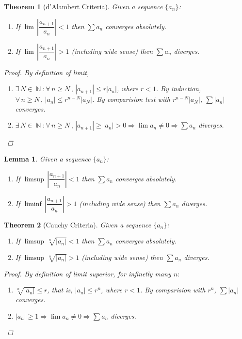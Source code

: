 \documentclass[12pt]{article}
\let\RA\Rightarrow
\newcommand{\Forall}[1]{\forall\,{#1}\,,\,}
\newcommand{\Exist}[1]{\exists\,{#1}:}
\DeclareMathOperator{\N}{\mathbb{N}}
\newtheorem{theorem}{Theorem}[subsection]
\newtheorem{lemma}{Lemma}[subsection]
\begin{document}
\begin{theorem}[d'Alambert Criteria]
  Given a sequence $\{a_n\}$:
  \begin{enumerate}
    \item If $\lim\,\left|\dfrac{a_{n+1}}{a_n}\right|<1$ then $\sum a_n$ converges absolutely.
    \item If $\lim\,\left|\dfrac{a_{n+1}}{a_n}\right|>1$ (including wide sense) then $\sum a_n$ diverges.
  \end{enumerate}
  \begin{proof}
    By definition of limit,
    \begin{enumerate}
      \item $\Exist{N\in\N}\Forall{n\geq N} |a_{n+1}|\leq r|a_n|$, where $r<1$. By induction, $\Forall{n\geq N}|a_n|\leq r^{n-N}|a_N|$. By comparision test with $r^{n-N}|a_N|$,  $\sum |a_n|$ converges.
      \item $\Exist{N\in\N}\Forall{n\geq N} |a_{n+1}|\geq |a_n|>0\RA\lim a_n\neq 0\RA \sum a_n$ diverges.
    \end{enumerate}
  \end{proof}
\end{theorem}

\begin{lemma}
  Given a sequence $\{a_n\}$:
  \begin{enumerate}
    \item If $\limsup\,\left|\dfrac{a_{n+1}}{a_n}\right|<1$ then $\sum a_n$ converges absolutely.
    \item If $\liminf\,\left|\dfrac{a_{n+1}}{a_n}\right|>1$ (including wide sense) then $\sum a_n$ diverges.
  \end{enumerate}
\end{lemma}

\begin{theorem}[Cauchy Criteria]
  Given a sequence $\{a_n\}$:
  \begin{enumerate}
    \item If $\limsup\,\sqrt[n]{|a_n|}<1$ then $\sum a_n$ converges absolutely.
    \item If $\limsup\,\sqrt[n]{|a_n|}>1$ (including wide sense) then $\sum a_n$ diverges.
  \end{enumerate}
  \begin{proof}
    By definition of limit superior, for infinetly many $n:$
    \begin{enumerate}
      \item $\sqrt[n]{|a_n|}\leq r$, that is, $|a_n|\leq r^n$, where $r<1$. By comparision with $r^n$,  $\sum |a_n|$ converges.
      \item $|a_n|\geq 1\RA\lim a_n\neq 0\RA \sum a_n$ diverges.
    \end{enumerate}
  \end{proof}
\end{theorem}
\end{document}

